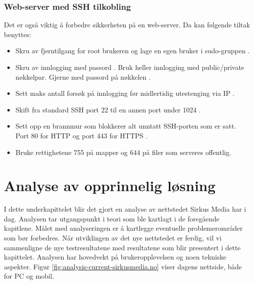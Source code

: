 
\subsubsection{Web-server med SSH tilkobling}
\label{sec:analysis-security-web-server-ssh}
Det er også viktig å forbedre sikkerheten på en web-server. Da kan følgende tiltak benyttes:
\begin{itemize}
\item Skru av fjerntilgang for root brukeren og lage en egen bruker i sudo-gruppen \cite{ellingwood_2014}.
\item Skru av innlogging med passord \cite{jetha2018}. Bruk heller innlogging med public/private nøkkelpar. Gjerne med passord på nøkkelen \cite{jetha2018}.
\item Sett maks antall forsøk på innlogging før midlertidig utestenging via IP \cite{ellingwood_2014_2}.
\item Skift fra standard SSH port 22 \cite{miessler2019} til en annen port under 1024 \cite{w3cports1995}.
\item Sett opp en brannmur som blokkerer alt unntatt SSH-porten som er satt. Port 80 for HTTP og port 443 for HTTPS \cite{virdo2016}.
\item Bruke rettighetene 755 på mapper og 644 på filer som serveres offentlig. \cite[s.~34]{barnettapache}
\end{itemize}

\section{Analyse av opprinnelig løsning}

I dette underkapittelet blir det gjort en analyse av nettstedet Sirkus Media har i dag. Analysen tar utgangspunkt i teori som ble kartlagt i de foregående kapitlene. Målet med analyseringen er å kartlegge eventuelle problemerområder som bør forbedres. Når utviklingen av det nye nettstedet er ferdig, vil vi sammenligne de nye testresultatene med resultatene som blir presentert i dette kapittelet. Analysen har hovedvekt på brukeropplevelsen og noen tekniske aspekter.
Figur \ref{fig:analysis-current-sirkusmedia.no} viser dagens nettside, både for PC og mobil.

